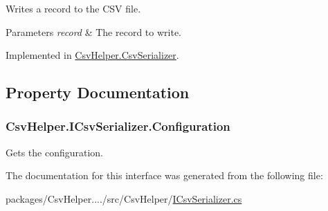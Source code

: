 Writes a record to the C\-S\-V file. 


\begin{DoxyParams}{Parameters}
{\em record} & The record to write.\\
\hline
\end{DoxyParams}


Implemented in \hyperlink{a00057_aefad906acd048863d3dd414651a44793}{Csv\-Helper.\-Csv\-Serializer}.



\subsection{Property Documentation}
\hypertarget{a00090_a54d241fe87517707b6f85c30fe8b3a95}{
\subsubsection[{Configuration}]{ Csv\-Helper.\-I\-Csv\-Serializer.\-Configuration\hspace{0.3cm}{\ttfamily [get]}}}\label{a00090_a54d241fe87517707b6f85c30fe8b3a95}


Gets the configuration. 



The documentation for this interface was generated from the following file\-:\begin{DoxyCompactItemize}
\item 
packages/\-Csv\-Helper..../src/\-Csv\-Helper/\hyperlink{a00209}{I\-Csv\-Serializer.\-cs}\end{DoxyCompactItemize}
